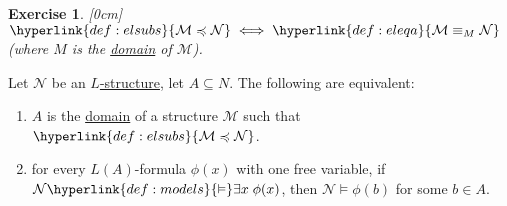 \documentclass{article}
\let\models\vDash
\newtheorem{nexercise}[nthm]{Exercise}
\begin{document}
\begin{nexercise}\label{ex:3.7}
  [0cm]
  $ \hyperlink{def:elsubs}{\mathcal{M}\preccurlyeq \mathcal{N}} \iff \hyperlink{def:eleqa}{\mathcal{M} \equiv_M \mathcal{N}}$ (where $M$ is the \hyperlink{def:str}{domain} of $\mathcal{M}$).
\end{nexercise}
\begin{nlemma}\label{lem:3.8}
  Let $\mathcal{N}$ be an \hyperlink{def:str}{$L$-structure}, let $A \subseteq N$. The following are equivalent:
  \begin{enumerate}[label=(\roman*)]
    \item $A$ is the \hyperlink{def:str}{domain} of a structure $\mathcal{M}$ such that $\hyperlink{def:elsubs}{\mathcal{M} \preccurlyeq \mathcal{N}}$.
    \item for every $L(A)$-formula $\phi(x)$ with one free variable, if $\mathcal{N} \hyperlink{def:models}{\models} \exists x \; \phi(x)$, then $\mathcal{N} \models \phi(b)$ for some $b \in A$.
  \end{enumerate}
\end{nlemma}
\end{document}
